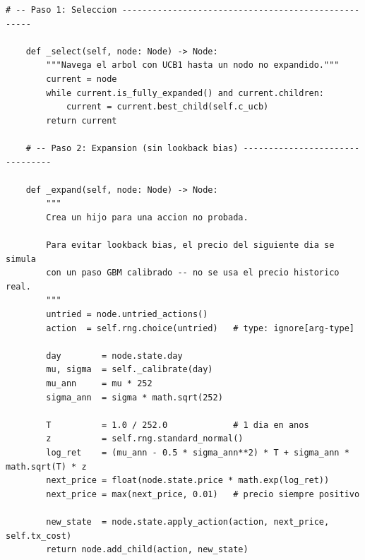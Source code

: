 \documentclass[12pt, a4paper]{article}
\begin{document}
\begin{lstlisting}[caption={Pasos 1 y 2 -- Seleccion y Expansion (sin lookback bias)}]
    # -- Paso 1: Seleccion ----------------------------------------------------

    def _select(self, node: Node) -> Node:
        """Navega el arbol con UCB1 hasta un nodo no expandido."""
        current = node
        while current.is_fully_expanded() and current.children:
            current = current.best_child(self.c_ucb)
        return current

    # -- Paso 2: Expansion (sin lookback bias) --------------------------------

    def _expand(self, node: Node) -> Node:
        """
        Crea un hijo para una accion no probada.

        Para evitar lookback bias, el precio del siguiente dia se simula
        con un paso GBM calibrado -- no se usa el precio historico real.
        """
        untried = node.untried_actions()
        action  = self.rng.choice(untried)   # type: ignore[arg-type]

        day        = node.state.day
        mu, sigma  = self._calibrate(day)
        mu_ann     = mu * 252
        sigma_ann  = sigma * math.sqrt(252)

        T          = 1.0 / 252.0             # 1 dia en anos
        z          = self.rng.standard_normal()
        log_ret    = (mu_ann - 0.5 * sigma_ann**2) * T + sigma_ann * math.sqrt(T) * z
        next_price = float(node.state.price * math.exp(log_ret))
        next_price = max(next_price, 0.01)   # precio siempre positivo

        new_state  = node.state.apply_action(action, next_price, self.tx_cost)
        return node.add_child(action, new_state)
\end{lstlisting}
\end{document}
